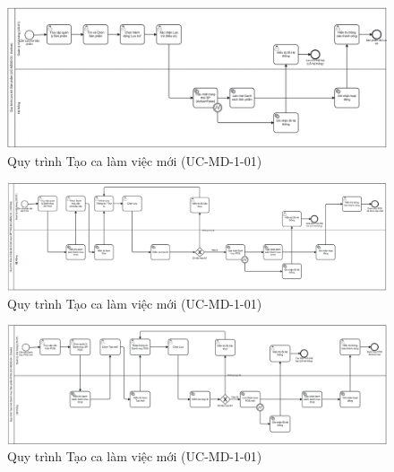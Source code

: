 \begin{figure}[H]
	\centering
	\includegraphics[width=15cm]{Sections/tong_quan/functional_spec/img/2.3.2.png}

     \vspace{0.5cm}
    \caption{Quy trình Tạo ca làm việc mới (UC-MD-1-01)}
\end{figure}

\begin{figure}[H]
	\centering
	\includegraphics[width=15cm]{Sections/tong_quan/functional_spec/img/2.4.1.png}

     \vspace{0.5cm}
    \caption{Quy trình Tạo ca làm việc mới (UC-MD-1-01)}
\end{figure}

\begin{figure}[H]
	\centering
	\includegraphics[width=15cm]{Sections/tong_quan/functional_spec/img/2.4.png}

     \vspace{0.5cm}
    \caption{Quy trình Tạo ca làm việc mới (UC-MD-1-01)}
\end{figure}

